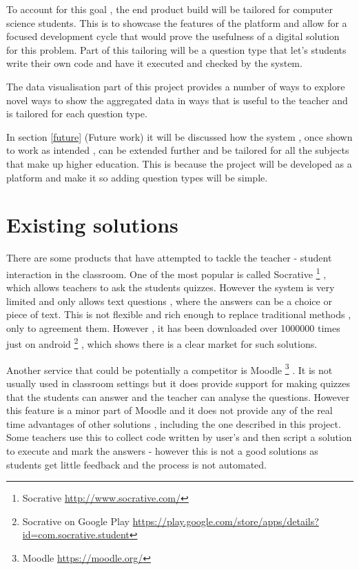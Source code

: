 \documentclass[11pt]{informatics-report}
\begin{document}
To account for this goal , the end product build will be tailored for computer science students. This is to showcase the features of the platform and allow for a focused development cycle that would prove the usefulness of a digital solution for this problem. Part of this tailoring will be a question type that let's students write their own code and have it executed and checked by the system.

The data visualisation part of this project provides a number of ways to explore novel ways to show the aggregated data in ways that is useful to the teacher and is tailored for each question type.

In section \ref{future} (Future work) it will be discussed how the system , once shown to work as intended , can be extended further and be tailored for all the subjects that make up higher education. This is because the project will be developed as a platform and make it so adding question types will be simple.


\section{Existing solutions}
There are some products that have attempted to tackle the teacher - student interaction in the classroom.
One of the most popular is called Socrative \footnote{Socrative \url{http://www.socrative.com/}} , which allows teachers to ask the students quizzes. However the system is very limited and only allows text questions , where the answers can be a choice or piece of text. This is not flexible and rich enough to replace traditional methods , only to agreement them. However , it has been downloaded over 1000000 times just on android \footnote{Socrative on Google Play \url{https://play.google.com/store/apps/details?id=com.socrative.student}} , which shows there is a clear market for such solutions.

Another service that could be potentially a competitor is Moodle \footnote{Moodle \url{https://moodle.org/}} . It is not usually used in classroom settings but it does provide support for making quizzes that the students can answer and the teacher can analyse the questions. However this feature is a minor part of Moodle and it does not provide any of the real time advantages of other solutions , including the one described in this project. Some teachers use this to collect code written by user's and then script a solution to execute and mark the answers - however this is not a good solutions as students get little feedback and the process is not automated.
\end{document}
